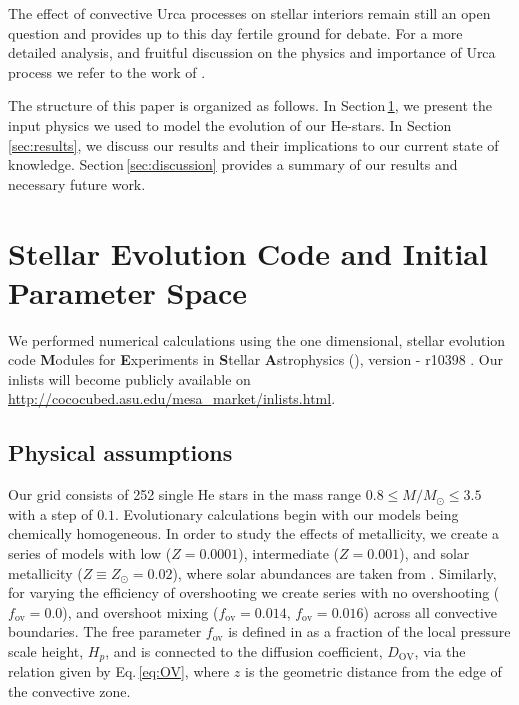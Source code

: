 \documentclass[../../main/thesis_msc.tex]{subfiles}
\begin{document}
The effect of convective Urca processes on stellar interiors remain still an open question and provides up to this day fertile ground for debate. For a more detailed analysis, and fruitful discussion on the physics and importance of Urca process we refer to the work of \cite{Paczy1973, Barkat1990, Ritossa1999, Stein1999, Lesaffre2005, Waldman2007, Denisseknkov2015, Schwab:2017epw}.

The structure of this paper is organized as follows. In Section\,\ref{sec:methods}, we present the input physics we used to model the evolution of our He-stars. In Section\,\ref{sec:results}, we discuss our results and their implications to our current state of knowledge. Section\,\ref{sec:discussion} provides a summary of our results and necessary future work.



\section{Stellar Evolution Code and Initial Parameter Space} \label{sec:methods}
We performed numerical calculations using the one dimensional, stellar evolution code \textbf{M}odules for \textbf{E}xperiments in \textbf{S}tellar \textbf{A}strophysics (\mesa), version - r10398 \citep{Paxton2011, Paxton:2013pj, Paxton2015, Paxton2018, Paxton2019}. Our \mesa inlists will become publicly available on \url{http://cococubed.asu.edu/mesa_market/inlists.html}.


\subsection{Physical assumptions} \label{sec:input_physics}
Our grid consists of 252 single He stars in the mass range $0.8 \leq M/M_{\odot} \leq 3.5$ with a step of $0.1$. Evolutionary calculations begin with our models being chemically homogeneous. In order to study the effects of metallicity, we create a series of models with low ($Z=0.0001$), intermediate ($Z=0.001$), and solar metallicity ($Z \equiv Z_{\odot} = 0.02$), where solar abundances are taken from \cite{grevesse1998}. Similarly, for varying the efficiency of overshooting we create series with no overshooting ($f_{\text{ov}} = 0.0$), and overshoot mixing ($f_{\text{ov}} = 0.014$, $f_{\text{ov}} = 0.016$) across all convective boundaries. The free parameter $f_{\text{ov}}$ is defined in \cite{Herwig2000} as a fraction of the local pressure scale height, $H_p$, and is connected to the diffusion coefficient, $D_{\text{OV}}$, via the relation given by Eq.\,\ref{eq:OV}, where $z$ is the geometric distance from the edge of the convective zone.
    					
\end{document}
